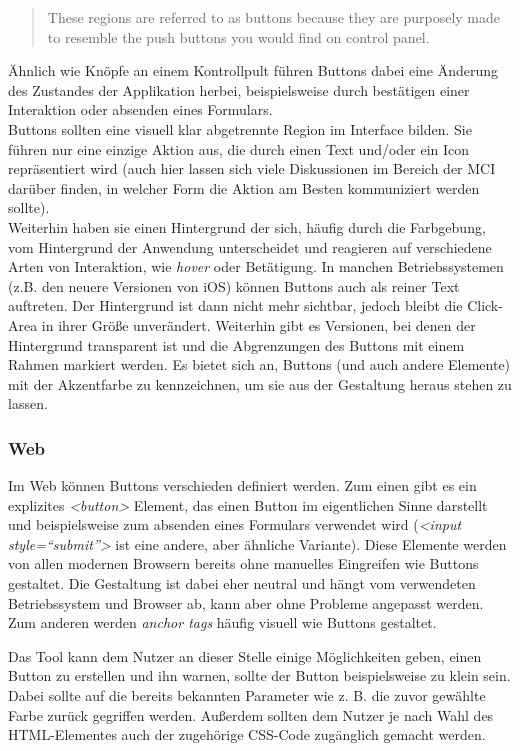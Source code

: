 \begin{quote}
These regions are referred to as buttons because they are purposely made to resemble the push buttons you would find on control panel. \cite{dix2009human}
\end{quote}

Ähnlich wie Knöpfe an einem Kontrollpult führen Buttons dabei eine Änderung des Zustandes der Applikation herbei, beispielsweise durch bestätigen einer Interaktion oder absenden eines Formulars. \\
Buttons sollten eine visuell klar abgetrennte Region im Interface bilden. Sie führen nur eine einzige Aktion aus, die durch einen Text und/oder ein Icon repräsentiert wird (auch hier lassen sich viele Diskussionen im Bereich der MCI darüber finden, in welcher Form die Aktion am Besten kommuniziert werden sollte). \\
Weiterhin haben sie einen Hintergrund der sich, häufig durch die Farbgebung, vom Hintergrund der Anwendung unterscheidet und reagieren auf verschiedene Arten von Interaktion, wie \textit{hover} oder Betätigung.
In manchen Betriebssystemen (z.B. den neuere Versionen von iOS) können Buttons auch als reiner Text auftreten. Der Hintergrund ist dann nicht mehr sichtbar, jedoch bleibt die Click-Area in ihrer Größe unverändert. Weiterhin gibt es Versionen, bei denen der Hintergrund transparent ist und die Abgrenzungen des Buttons mit einem Rahmen markiert werden.
Es bietet sich an, Buttons (und auch andere Elemente) mit der Akzentfarbe zu kennzeichnen, um sie aus der Gestaltung heraus stehen zu lassen.

\subsubsection{Web}
Im Web können Buttons verschieden definiert werden. Zum einen gibt es ein explizites \textit{<button>} Element, das einen Button im eigentlichen Sinne darstellt und beispielsweise zum absenden eines Formulars verwendet wird (\textit{<input style=“submit”>} ist eine andere, aber ähnliche Variante). Diese Elemente werden von allen modernen Browsern bereits ohne manuelles Eingreifen wie Buttons gestaltet. Die Gestaltung ist dabei eher neutral und hängt vom verwendeten Betriebssystem und Browser ab, kann aber ohne Probleme angepasst werden. \\
Zum anderen werden \textit{anchor tags} häufig visuell wie Buttons gestaltet.

Das Tool kann dem Nutzer an dieser Stelle einige Möglichkeiten geben, einen Button zu erstellen und ihn warnen, sollte der Button beispielsweise zu klein sein. Dabei sollte auf die bereits bekannten Parameter wie z. B. die zuvor gewählte Farbe zurück gegriffen werden. Außerdem sollten dem Nutzer je nach Wahl des HTML-Elementes auch der zugehörige CSS-Code zugänglich gemacht werden.


